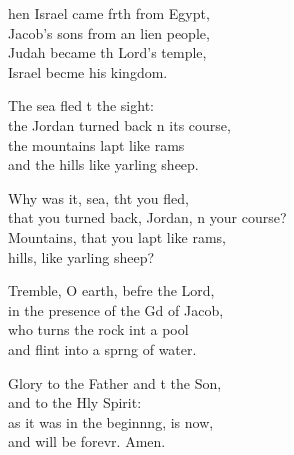 \settowidth{\versewidth}{that you turned back, Jordan, on your course?}
\begin{psalmverse}%
  \begin{patverse}
hen Israel came frth from Egypt,\Med\\
Jacob’s sons from an lien people,\\
Judah became th Lord’s temple,\Med\\
Israel becme his kingdom.

The sea fled t the sight:\Med\\
the Jordan turned back n its course,\\
the mountains lapt like rams\Med\\
and the hills like yarling sheep.

Why was it, sea, tht you fled,\Med\\
that you turned back, Jordan, n your course?\\
Mountains, that you lapt like rams,\Med\\
hills, like yarling sheep?

Tremble, O earth, befre the Lord,\Med\\
in the presence of the Gd of Jacob,\\
who turns the rock int a pool\Med\\
and flint into a spr\pointup{\i}ng of water.

Glory to the Father and t the Son,\Med\\
and to the Hly Spirit:\\
as it was in the beginn\pointup{\i}ng, is now,\Med\\
and will be forevr. Amen.
  \end{patverse}
\end{psalmverse}
